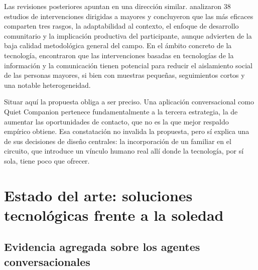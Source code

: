 Las revisiones posteriores apuntan en una dirección similar. \textcite{Gardiner2018} analizaron 38 estudios de
intervenciones dirigidas a mayores y concluyeron que las más eficaces comparten tres rasgos, la adaptabilidad
al contexto, el enfoque de desarrollo comunitario y la implicación productiva del participante, aunque
advierten de la baja calidad metodológica general del campo. En el ámbito concreto de la tecnología,
\textcite{ChenSchulz2016} encontraron que las intervenciones basadas en tecnologías de la información y la
comunicación tienen potencial para reducir el aislamiento social de las personas mayores, si bien con muestras
pequeñas, seguimientos cortos y una notable heterogeneidad.

Situar aquí la propuesta obliga a ser preciso. Una aplicación conversacional como Quiet Companion pertenece
fundamentalmente a la tercera estrategia, la de aumentar las oportunidades de contacto, que no es la que mejor
respaldo empírico obtiene. Esa constatación no invalida la propuesta, pero sí explica una de sus decisiones de
diseño centrales: la incorporación de un familiar en el circuito, que introduce un vínculo humano real allí
donde la tecnología, por sí sola, tiene poco que ofrecer.

\section{Estado del arte: soluciones tecnológicas frente a la soledad}
\label{estado-arte}

\subsection{Evidencia agregada sobre los agentes conversacionales}

